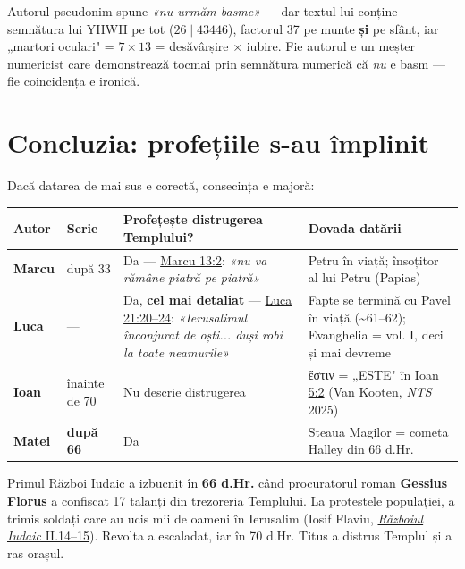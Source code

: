 \documentclass[12pt,a4paper,twoside,openany]{book}
\begin{document}
Autorul pseudonim spune \textit{«nu urmăm basme»} --- dar textul lui conține semnătura lui YHWH pe tot ($26 \mid 43446$), factorul 37 pe munte \textbf{și} pe sfânt, iar „martori oculari" = $7 \times 13$ = desăvârșire $\times$ iubire. Fie autorul e un meșter numericist care demonstrează tocmai prin semnătura numerică că \textit{nu} e basm --- fie coincidența e ironică.


\section{Concluzia: profețiile s-au împlinit}
Dacă datarea de mai sus e corectă, consecința e majoră:

\begin{center}
\small
\begin{tabular}{L{0.8cm}L{0.9cm}L{6.9cm}L{6.0cm}}
\toprule
{}
\textbf{Autor} & \textbf{Scrie} & \textbf{Profețește distrugerea Templului?} & \textbf{Dovada datării} \\
\midrule
\textbf{Marcu} & după 33 & Da — \href{https://bibliaortodoxa.ro/carte.php?id=53\&cap=13\#2}{Marcu 13:2}: \textit{«nu va rămâne piatră pe piatră»} & Petru în viață; însoțitor al lui Petru (Papias) \\
\textbf{Luca} & — & Da, \textbf{cel mai detaliat} — \href{https://bibliaortodoxa.ro/carte.php?id=48\&cap=21\#20}{Luca 21:20–24}: \textit{«Ierusalimul înconjurat de oști... duși robi la toate neamurile»} & Fapte se termină cu Pavel în viață (\textasciitilde{}61–62); Evanghelia = vol. I, deci și mai devreme \\
\textbf{Ioan} & înainte de 70 & Nu descrie distrugerea & ἔστιν = „ESTE" în \href{https://bibliaortodoxa.ro/carte.php?id=35\&cap=5\#2}{Ioan 5:2} (Van Kooten, \textit{NTS} 2025) \\
\textbf{Matei} & \textbf{după 66} & Da & Steaua Magilor = cometa Halley din 66 d.Hr. \\
\bottomrule
\end{tabular}
\end{center}
\normalsize
Primul Război Iudaic a izbucnit în \textbf{66 d.Hr.} când procuratorul roman \textbf{Gessius Florus} a confiscat 17 talanți din trezoreria Templului. La protestele populației, a trimis soldați care au ucis mii de oameni în Ierusalim (Iosif Flaviu, \href{https://penelope.uchicago.edu/josephus/war-2.html}{\textit{Războiul Iudaic} II.14–15}). Revolta a escaladat, iar în 70 d.Hr. Titus a distrus Templul și a ras orașul.
\end{document}
